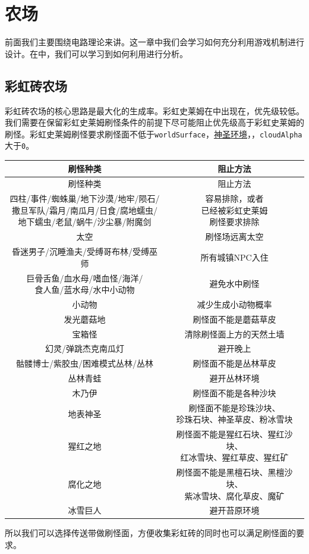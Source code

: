\chapter{农场}

前面我们主要围绕电路理论来讲。这一章中我们会学习如何充分利用游戏机制进行设计。在中，我们可以学习到如何利用进行分析。

\section{彩虹砖农场}\label{sec22}
彩虹砖农场的核心思路是最大化的生成率。彩虹史莱姆在中出现在，优先级较低。我们需要在保留彩虹史莱姆刷怪条件的前提下尽可能阻止优先级高于彩虹史莱姆的刷怪。彩虹史莱姆刷怪要求刷怪面不低于\lstinline{worldSurface}，\hyperref[app37]{神圣环境}，，\lstinline{cloudAlpha}大于\lstinline{0}。
\begin{longtable}{|c|c|}
\hline
刷怪种类&阻止方法\\\hline
\endfirsthead
\hline
刷怪种类&阻止方法\\\hline
\endhead
\hline
\endfoot
\makecell{四柱/事件/蜘蛛巢/地下沙漠/地牢/陨石/\\ 撒旦军队/霜月/南瓜月/日食/腐地蠕虫/\\ 地下蠕虫/老鼠/蜗牛/沙尘暴/附魔剑}&\makecell{容易排除，或者\\ 已经被彩虹史莱姆\\ 刷怪要求排除}\\\hline
太空&刷怪场远离太空\\\hline
昏迷男子/沉睡渔夫/受缚哥布林/受缚巫师&所有城镇NPC入住\\\hline
\makecell{巨骨舌鱼/血水母/嗜血怪/海洋/\\ 食人鱼/蓝水母/水中小动物}&避免水中刷怪\\\hline
小动物&减少生成小动物概率\\\hline
发光蘑菇地&刷怪面不能是蘑菇草皮\\\hline
宝箱怪&清除刷怪面上方的天然土墙\\\hline
幻灵/弹跳杰克南瓜灯&避开晚上\\\hline
骷髅博士/紫胶虫/困难模式丛林/丛林&刷怪面不能是丛林草皮\\\hline
丛林青蛙&避开丛林环境\\\hline
木乃伊&刷怪面不能是各种沙块\\\hline
地表神圣&\makecell{刷怪面不能是珍珠沙块、\\ 珍珠石块、神圣草皮、粉冰雪块}\\\hline
猩红之地&\makecell{刷怪面不能是猩红石块、猩红沙块、\\ 红冰雪块、猩红草皮、猩红矿}\\\hline
腐化之地&\makecell{刷怪面不能是黑檀石块、黑檀沙块、\\ 紫冰雪块、腐化草皮、魔矿}\\\hline
冰雪巨人&避开苔原环境
\end{longtable}
所以我们可以选择传送带做刷怪面，方便收集彩虹砖的同时也可以满足刷怪面的要求。

